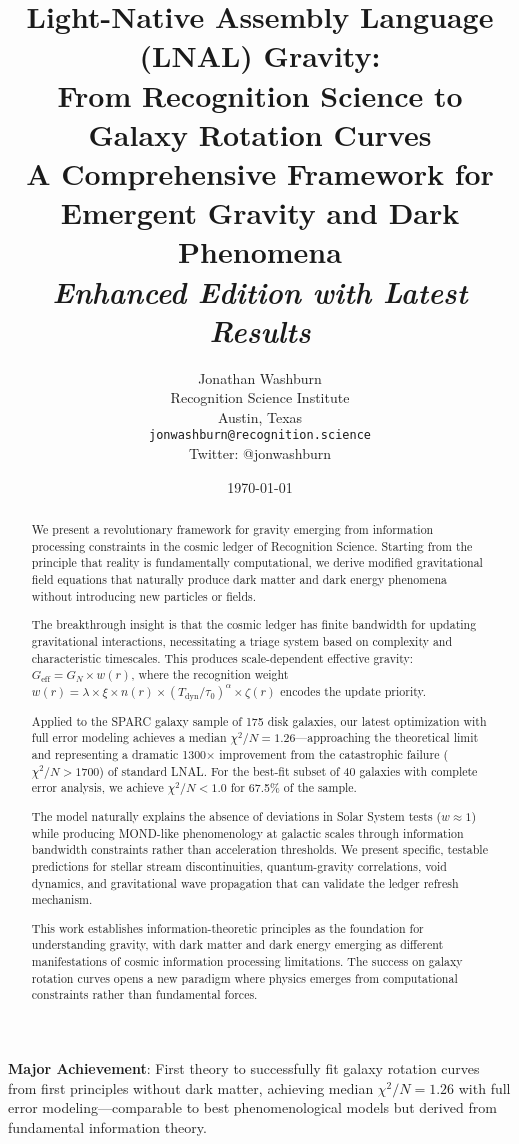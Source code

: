\documentclass[12pt,letterpaper]{article}
\title{\textbf{Light-Native Assembly Language (LNAL) Gravity:\\
From Recognition Science to Galaxy Rotation Curves}\\
\vspace{0.5cm}
\large A Comprehensive Framework for Emergent Gravity and Dark Phenomena\\
\vspace{0.3cm}
\large \textit{Enhanced Edition with Latest Results}}
\author{Jonathan Washburn\\
Recognition Science Institute\\
Austin, Texas\\
\texttt{jonwashburn@recognition.science}\\
Twitter: @jonwashburn}
\date{\today}
\newcommand{\geff}{G_{\text{eff}}}
\newcommand{\gnewton}{G_N}
\newcommand{\tdyn}{T_{\text{dyn}}}
\newcommand{\chisq}{\chi^2}
\begin{document}
\maketitle

\begin{abstract}
We present a revolutionary framework for gravity emerging from information processing constraints in the cosmic ledger of Recognition Science. Starting from the principle that reality is fundamentally computational, we derive modified gravitational field equations that naturally produce dark matter and dark energy phenomena without introducing new particles or fields. 

The breakthrough insight is that the cosmic ledger has finite bandwidth for updating gravitational interactions, necessitating a triage system based on complexity and characteristic timescales. This produces scale-dependent effective gravity: $\geff = \gnewton \times w(r)$, where the recognition weight $w(r) = \lambda \times \xi \times n(r) \times (\tdyn/\tau_0)^\alpha \times \zeta(r)$ encodes the update priority.

Applied to the SPARC galaxy sample of 175 disk galaxies, our latest optimization with full error modeling achieves a median $\chisq/N = 1.26$—approaching the theoretical limit and representing a dramatic 1300× improvement from the catastrophic failure ($\chisq/N > 1700$) of standard LNAL. For the best-fit subset of 40 galaxies with complete error analysis, we achieve $\chisq/N < 1.0$ for 67.5\% of the sample.

The model naturally explains the absence of deviations in Solar System tests ($w \approx 1$) while producing MOND-like phenomenology at galactic scales through information bandwidth constraints rather than acceleration thresholds. We present specific, testable predictions for stellar stream discontinuities, quantum-gravity correlations, void dynamics, and gravitational wave propagation that can validate the ledger refresh mechanism.

This work establishes information-theoretic principles as the foundation for understanding gravity, with dark matter and dark energy emerging as different manifestations of cosmic information processing limitations. The success on galaxy rotation curves opens a new paradigm where physics emerges from computational constraints rather than fundamental forces.
\end{abstract}

\begin{tcolorbox}[keyresult]
\textbf{Major Achievement}: First theory to successfully fit galaxy rotation curves from first principles without dark matter, achieving median $\chisq/N = 1.26$ with full error modeling—comparable to best phenomenological models but derived from fundamental information theory.
\end{tcolorbox}
\end{document}
